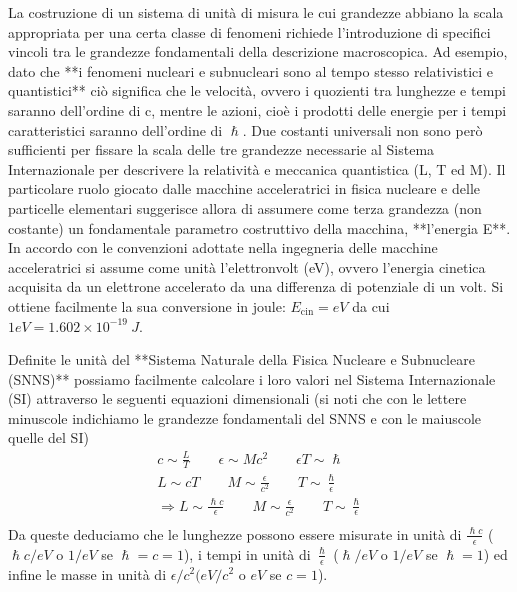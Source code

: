 La costruzione di un sistema di unità di misura le cui grandezze abbiano la scala appropriata per una certa classe di fenomeni richiede l'introduzione di specifici vincoli tra le grandezze fondamentali della descrizione macroscopica.
Ad esempio, dato che **i fenomeni nucleari e subnucleari sono al tempo stesso relativistici e quantistici** ciò significa che le velocità, ovvero i quozienti tra lunghezze e tempi saranno dell'ordine di c, mentre le azioni, cioè i prodotti delle energie per i tempi caratteristici saranno dell'ordine di $\hslash$.
Due costanti universali non sono però sufficienti per fissare la scala delle tre grandezze necessarie al Sistema Internazionale per descrivere la relatività e meccanica quantistica (L, T ed M).
Il particolare ruolo giocato dalle macchine acceleratrici in fisica nucleare e delle particelle elementari suggerisce allora di assumere come terza grandezza (non costante) un fondamentale parametro costruttivo della macchina, **l'energia E**.
In accordo con le convenzioni adottate nella ingegneria delle macchine acceleratrici si assume come unità l'elettronvolt (eV), ovvero l'energia cinetica acquisita da un elettrone accelerato da una differenza di potenziale di un volt.
Si ottiene facilmente la sua conversione in joule: $E_\text{cin} = eV$ da cui $1 eV = 1.602 \times 10^{-19} \ J$.

Definite le unità del **Sistema Naturale della Fisica Nucleare e Subnucleare (SNNS)** possiamo facilmente calcolare i loro valori nel Sistema Internazionale (SI) attraverso le seguenti equazioni dimensionali (si noti che con le lettere minuscole indichiamo le grandezze fondamentali del SNNS e con le maiuscole quelle del SI)
\begin{gather*}
    c \sim \frac{L}{T} \qquad \epsilon \sim M c^2 \qquad \epsilon T \sim \hslash\\
    L \sim cT \qquad M \sim \frac{\epsilon}{c^2} \qquad T \sim \frac{\hslash}{\epsilon} \\
    \Longrightarrow L \sim \frac{\hslash c}{\epsilon} \qquad M \sim \frac{\epsilon}{c^2} \qquad T \sim           \frac{\hslash}{\epsilon}\\
\end{gather*}
Da queste deduciamo che le lunghezze possono essere misurate in unità di $\frac{\hslash c}{\epsilon}$ ($\hslash c / eV$ o $1/eV$ se $\hslash=c=1$), i tempi in unità di $\frac{\hslash}{\epsilon}$ ($\hslash/eV$ o $1/eV$ se $\hslash=1$) ed infine le masse in unità di $\epsilon/c^2(eV/c^2$ o $eV$ se $c=1$).

